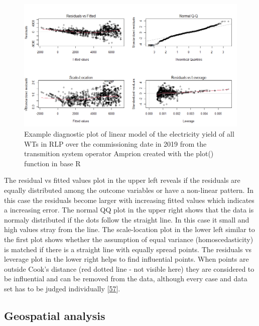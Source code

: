 \documentclass[a4paper,11pt]{article}
\begin{document}
\begin{figure}[H]

{\centering \includegraphics[width=1\linewidth]{figures/diagnostics} 

}

\caption{Example diagnostic plot of linear model of the electricity yield of all WTs in RLP over the commissioning date in 2019 from the transmition system operator Amprion created with the plot() function in base R}\label{fig:diagnostics}
\end{figure}
The residual vs fitted values plot in the upper left reveals if the residuals are equally distributed among the outcome variables or have a non-linear pattern. In this case the residuals become larger with increasing fitted values which indicates a increasing error. The normal QQ plot in the upper right shows that the data is normaly distributed if the dots follow the straight line. In this case it small and high values stray from the line. The scale-location plot in the lower left similar to the first plot shows whether the assumption of equal variance (homoscedasticity) is matched if there is a straight line with equally spread points. The residuals vs leverage plot in the lower right helps to find influential points. When points are outside Cook's distance (red dotted line - not visible here) they are considered to be influential and can be removed from the data, although every case and data set has to be judged individually {[}\protect\hyperlink{ref-BommaeKim.2015}{57}{]}.

\hypertarget{geospatial-analysis}{%
\subsection{Geospatial analysis}\label{geospatial-analysis}}
\end{document}

